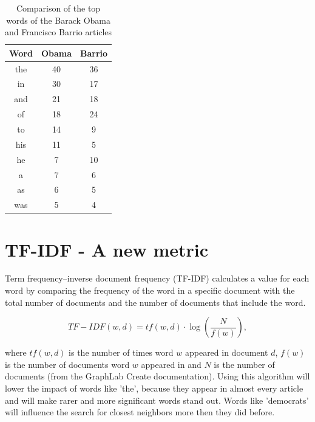 \documentclass[12pt]{scrreprt}
\begin{document}
\begin{table}[H]
  \caption{Comparison of the top words of the Barack Obama and Francisco Barrio articles}
  \label{tab:compare_top_words}
  \begin{center}
    \begin{tabular}{| c | c | c |}
      \hline
      \textbf{Word} & \textbf{Obama} & \textbf{Barrio}\\
      \hline
      \hline
      the & 40 & 36 \\ \hline
      in & 30 & 17 \\ \hline
      and & 21 & 18 \\ \hline
      of & 18 & 24 \\ \hline
      to & 14 & 9 \\ \hline
      his & 11 & 5 \\ \hline
      he & 7 & 10 \\ \hline
      a & 7 & 6 \\ \hline
      as & 6 & 5 \\ \hline
      was & 5 & 4 \\ \hline
    \end{tabular}	
  \end{center}
\end{table}

\section{TF-IDF - A new metric}

Term frequency–inverse document frequency (TF-IDF) calculates a value for each word by comparing the frequency of the word in a specific document with the total number of documents and the number of documents that include the word.\\

\begin{center}
\begin{equation}
\label{eq:td-idf}
TF-IDF(w,d)=tf(w,d) \cdot \log \left( \frac{N}{f(w)} \right),
\end{equation}
\end{center}
\noindent
where $tf(w,d)$ is the number of times word $w$ appeared in document $d$, $f(w)$ is the number of documents word $w$ appeared in and $N$ is the number of documents (from the GraphLab Create documentation). Using this algorithm will lower the impact of words like 'the', because they appear in almost every article and will make rarer and more significant words stand out. Words like 'democrats' will influence the search for closest neighbors more then they did before.\\
\end{document}
